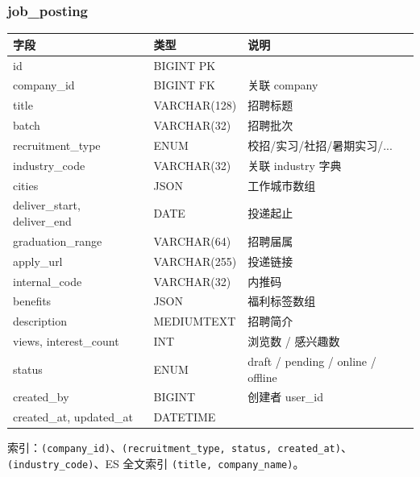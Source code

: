 \documentclass[11pt,a4paper]{ctexart}
\begin{document}
\subsubsection{job\_posting}
\begin{longtable}{p{3.4cm}p{3cm}p{7.6cm}}
\toprule
字段 & 类型 & 说明\\
\midrule
id & BIGINT PK & \\
company\_id & BIGINT FK & 关联 company\\
title & VARCHAR(128) & 招聘标题\\
batch & VARCHAR(32) & 招聘批次\\
recruitment\_type & ENUM & 校招/实习/社招/暑期实习/...\\
industry\_code & VARCHAR(32) & 关联 industry 字典\\
cities & JSON & 工作城市数组\\
deliver\_start, deliver\_end & DATE & 投递起止\\
graduation\_range & VARCHAR(64) & 招聘届属\\
apply\_url & VARCHAR(255) & 投递链接\\
internal\_code & VARCHAR(32) & 内推码\\
benefits & JSON & 福利标签数组\\
description & MEDIUMTEXT & 招聘简介\\
views, interest\_count & INT & 浏览数 / 感兴趣数\\
status & ENUM & draft / pending / online / offline\\
created\_by & BIGINT & 创建者 user\_id\\
created\_at, updated\_at & DATETIME & \\
\bottomrule
\end{longtable}
索引：\texttt{(company\_id)}、\texttt{(recruitment\_type, status, created\_at)}、\texttt{(industry\_code)}、ES 全文索引 \texttt{(title, company\_name)}。
\end{document}

